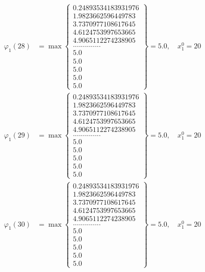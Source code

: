 \documentclass{article}
\begin{document}
\begin{align*}
  
  
  
\varphi_{1}(28) &= \max \left\{ \begin{array}{c}
0.24893534183931976 \\
 1.9823662596449783 \\
 3.7370977108617645 \\
 4.6124753997653665 \\
 4.9065112274238905 \\
 .............. \\
 5.0 \\
 5.0 \\
 5.0 \\
 5.0 \\
 5.0
\end{array} \right\} = 5.0, \quad x_{1}^0 = 20\\
  
  
  
  
\varphi_{1}(29) &= \max \left\{ \begin{array}{c}
0.24893534183931976 \\
 1.9823662596449783 \\
 3.7370977108617645 \\
 4.6124753997653665 \\
 4.9065112274238905 \\
 .............. \\
 5.0 \\
 5.0 \\
 5.0 \\
 5.0 \\
 5.0
\end{array} \right\} = 5.0, \quad x_{1}^0 = 20\\
  
  
  
  
\varphi_{1}(30) &= \max \left\{ \begin{array}{c}
0.24893534183931976 \\
 1.9823662596449783 \\
 3.7370977108617645 \\
 4.6124753997653665 \\
 4.9065112274238905 \\
 .............. \\
 5.0 \\
 5.0 \\
 5.0 \\
 5.0 \\
 5.0
\end{array} \right\} = 5.0, \quad x_{1}^0 = 20\\
  

\end{align*}
\end{document}
